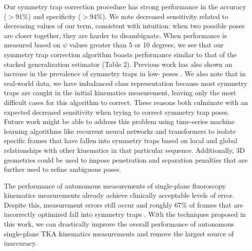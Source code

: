 Our symmetry trap correction procedure has strong performance in the accuracy ($>91\%$) and specificity ($>94\%$).
We note decreased sensitivity related to decreasing values of our  term, consistent with intuition: when two possible poses are closer together, they are harder to disambiguate.
When performance is measured based on $\psi$ values greater than 5 or 10 degrees, we see that our symmetry trap correction algorithm boasts performance similar to that of the stacked generalization estimator (Table 2).
Previous work has also shown an increase in the prevalence of symmetry traps in low- poses \cite{jensenJointTrackMachine2023}.
We also note that in real-world data, we have imbalanced class representation because most symmetry traps are caught in the initial kinematics measurement, leaving only the most difficult cases for this algorithm to correct.
These reasons both culminate with an expected decreased sensitivity when trying to correct symmetry trap poses.
Future work might be able to address this problem using time-series machine learning algorithms like recurrent neural networks \cite{hochreiterLongShortTermMemory1997} and transformers \cite{vaswaniAttentionAllYou2017} to isolate specific frames that have fallen into symmetry traps based on local and global relationships with other kinematics in that particular sequence.
Additionally, 3D geometries could be used to impose penetration and separation penalties that are further used to refine ambiguous poses.


The performance of autonomous measurements of single-plane fluoroscopy kinematics measurements already achieve clinically acceptable levels of error.
Despite this, measurement errors still occur and roughly 67\% of frames that are incorrectly optimized fall into symmetry traps \cite{jensenJointTrackMachine2023,brobergValidationMachineLearning2023}.
With the techniques proposed in this work, we can drastically improve the overall performance of autonomous single-plane TKA kinematics measurements and remove the largest source of inaccuracy.


